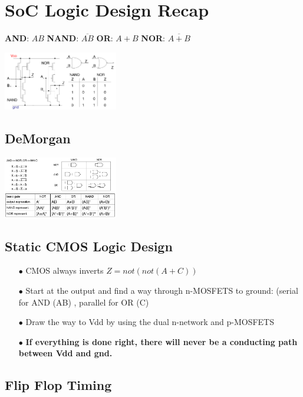 \documentclass[english]{latex4ei/latex4ei_sheet}
\begin{document}
\section{SoC Logic Design Recap}
\textbf{AND}: $A B$
\textbf{NAND}: $\overline{A B}$
\textbf{OR}: $A + B$
\textbf{NOR}: $\overline{A + B}$
\begin{center}
	\includegraphics[width = 5cm ]{images/2. SoC Logic Design Recap/NandNor.png}
\end{center}
\subsection{DeMorgan}
\begin{center}
	\includegraphics[width = 5cm ]{images/2. SoC Logic Design Recap/DeMorgan.png}
\end{center}
\subsection{Static CMOS Logic Design}
\begin{enumerate}
	\item[$\bullet$] CMOS always inverts $Z = not(not(A + C))$
	\item[$\bullet$] Start at the output and find a way through n-MOSFETS to ground: (serial for AND (AB) , parallel for OR (C)
	\item[$\bullet$] Draw the way to Vdd by using the dual n-network and p-MOSFETS
	\item[$\bullet$] \textbf{If everything is done right, there will
		      never be a conducting path between Vdd
		      and gnd.}
\end{enumerate}



\subsection{Flip Flop Timing}
\end{document}
